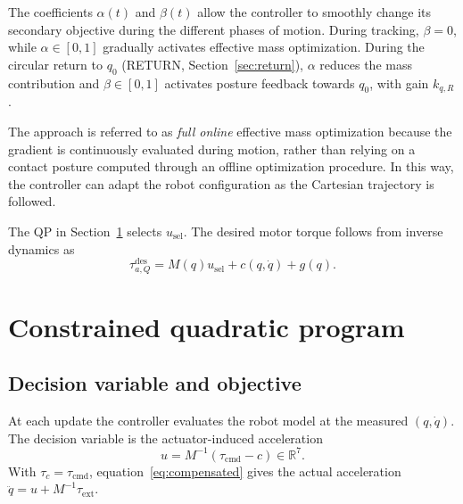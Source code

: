 \documentclass[11pt,a4paper]{article}
\begin{document}
The coefficients $\alpha(t)$ and $\beta(t)$ allow the controller
to smoothly change its secondary objective during the different
phases of motion. During tracking, $\beta=0$, while $\alpha\in[0,1]$
gradually activates effective mass optimization. During the circular
return to $q_0$ (RETURN, Section~\ref{sec:return}), $\alpha$ reduces the
mass contribution and $\beta\in[0,1]$ activates posture feedback towards
$q_0$, with gain $k_{q,R}$.


The approach is referred to as \emph{full online} effective mass
optimization because the gradient is continuously evaluated during
motion, rather than relying on a contact posture computed through
an offline optimization procedure. In this way, the controller
can adapt the robot configuration as the Cartesian trajectory
is followed.

The QP in Section~\ref{sec:qp} selects $u_{\mathrm{sel}}$. The desired
motor torque follows from inverse dynamics as
\begin{equation}
 \boxed{\tau_{a,Q}^{\mathrm{des}}
 =M(q)u_{\mathrm{sel}}+c(q,\dot q)+g(q).}
 \label{eq:optimized-output}
\end{equation}

\section{Constrained quadratic program}
\label{sec:qp}
\subsection{Decision variable and objective}
At each update the controller evaluates the robot model at the measured
$(q,\dot q)$. The decision variable is the actuator-induced acceleration
\begin{equation}
 u=M^{-1}(\tau_{\mathrm{cmd}}-c)\in\mathbb R^7.
 \label{eq:qp-variable}
\end{equation}
With $\tau_c=\tau_{\mathrm{cmd}}$, equation~\eqref{eq:compensated} gives the
actual acceleration $\ddot q=u+M^{-1}\tau_{\mathrm{ext}}$.
\end{document}
